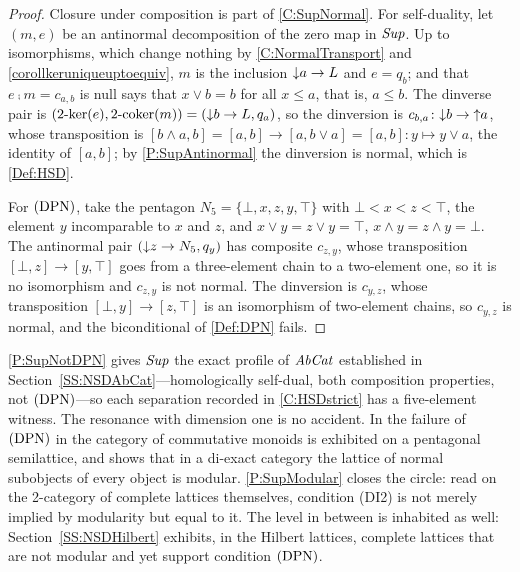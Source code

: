 \begin{proof}
  \leanok
  Closure under composition is part of \corx\ref{C:SupNormal}. For self-duality, let \((m,e)\) be an antinormal decomposition of the zero map in \(\mathit{Sup}\). Up to isomorphisms, which change nothing by \corx\ref{C:NormalTransport} and \corx\ref{corollkeruniqueuptoequiv}, \(m\) is the inclusion \({\downarrow}a\to L\) and \(e=q_{b}\); and that \(e\comp m=c_{a,b}\) is null says that \(x\vee b=b\) for all \(x\leq a\), that is, \(a\leq b\). The dinverse pair is \((2\text{-}\mathrm{ker}(e),2\text{-}\mathrm{coker}(m))=({\downarrow}b\to L,q_{a})\), so the dinversion is \(c_{b,a}\colon{\downarrow}b\to{\uparrow}a\), whose transposition is \([b\wedge a,b]=[a,b]\to[a,b\vee a]=[a,b]\colon y\mapsto y\vee a\), the identity of \([a,b]\); by \prox\ref{P:SupAntinormal} the dinversion is normal, which is \ref{Def:HSD}.

	For \(\textup{(DPN)}\), take the pentagon \(N_{5}=\{\bot,x,z,y,\top\}\) with \(\bot<x<z<\top\), the element \(y\) incomparable to \(x\) and \(z\), and \(x\vee y=z\vee y=\top\), \(x\wedge y=z\wedge y=\bot\). The antinormal pair \(({\downarrow}z\to N_{5},q_{y})\) has composite \(c_{z,y}\), whose transposition \([\bot,z]\to[y,\top]\) goes from a three-element chain to a two-element one, so it is no isomorphism and \(c_{z,y}\) is not normal. The dinversion is \(c_{y,z}\), whose transposition \([\bot,y]\to[z,\top]\) is an isomorphism of two-element chains, so \(c_{y,z}\) is normal, and the biconditional of \ref{Def:DPN} fails.
\end{proof}

\begin{remark}
  \label{Rem Lattice Profile}
  \prox\ref{P:SupNotDPN} gives \(\mathit{Sup}\) the exact profile of \(\mathit{AbCat}\) established in Section~\ref{SS:NSDAbCat}---homologically self-dual, both composition properties, not \(\textup{(DPN)}\)---so each separation recorded in \corx\ref{C:HSDstrict} has a five-element witness. The resonance with dimension one is no accident. In \cite[Example~4.2.1]{Afsa-24} the failure of \(\textup{(DPN)}\) in the category of commutative monoids is exhibited on a pentagonal semilattice, and \cite[Theorem~4.3.4]{Afsa-24} shows that in a di-exact category the lattice of normal subobjects of every object is modular. \prox\ref{P:SupModular} closes the circle: read on the 2-category of complete lattices themselves, condition \textup{(DI2)} is not merely implied by modularity but equal to it. The level in between is inhabited as well: Section~\ref{SS:NSDHilbert} exhibits, in the Hilbert lattices, complete lattices that are not modular and yet support condition \(\textup{(DPN)}\).
\end{remark}

